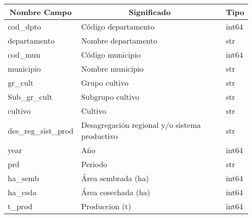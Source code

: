 \documentclass[12pt,a4paper]{article}
\begin{document}
\begin{table}[]
    \centering
    \begin{tabular}{|l|l|l|}
        \hline
        \multicolumn{1}{|c|}{\textbf{Nombre Campo}} & \multicolumn{1}{c|}{\textbf{Significado}}     & \multicolumn{1}{c|}{\textbf{Tipo}} \\ \hline
        cod\_dpto                                   & Código departamento                           & int64                              \\ \hline
        departamento                                & Nombre departamento                           & str                                \\ \hline
        cod\_mun                                    & Código municipio                              & int64                              \\ \hline
        municipio                                   & Nombre municipio                              & str                                \\ \hline
        gr\_cult                                    & Grupo cultivo                                 & str                                \\ \hline
        Sub\_gr\_cult                               & Subgrupo cultivo                              & str                                \\ \hline
        cultivo                                     & Cultivo                                       & str                                \\ \hline
        des\_reg\_sist\_prod                        & Desagregación regional y/o sistema productivo & str                                \\ \hline
        year                                        & Año                                           & int64                              \\ \hline
        prd                                         & Periodo                                       & str                                \\ \hline
        ha\_semb                                    & Área sembrada (ha)                            & int64                              \\ \hline
        ha\_csda                                    & Área cosechada (ha)                           & int64                              \\ \hline
        t\_prod                                     & Produccion (t)                                & int64                              \\ \hline

\end{tabular}
\end{table}
\end{document}
